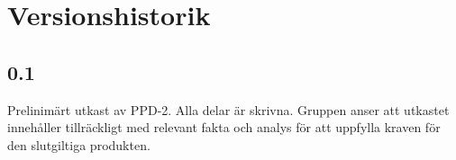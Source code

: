 \section*{Versionshistorik}

\subsection*{0.1}
Prelinimärt utkast av PPD-2. Alla delar är skrivna. Gruppen anser att utkastet innehåller tillräckligt med relevant fakta och analys för att uppfylla kraven för den slutgiltiga produkten.